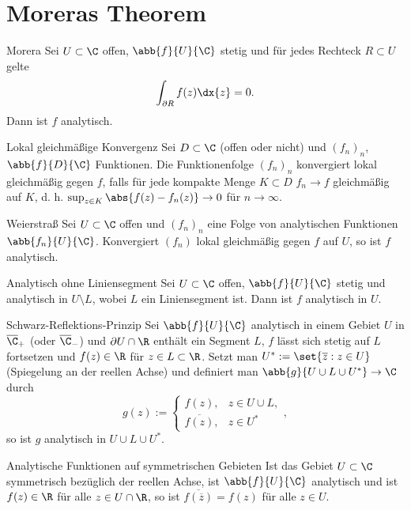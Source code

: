 \section{Moreras Theorem}

\begin{karte}{Morera}
    Sei \(U\subset \C\) offen, \(\abb{f}{U}{\C}\) stetig und für jedes Rechteck 
    \(R \subset U\) gelte 
    \[ \int_{\partial R} f(z) \dx{z} = 0. \]
    Dann ist \(f\) analytisch.
\end{karte}

\begin{karte}{Lokal gleichmäßige Konvergenz}
    Sei \( D \subset \C \) (offen oder nicht) und \((f_n)_n\), \(\abb{f}{D}{\C}\) Funktionen. 
    Die Funktionenfolge \((f_n)_n\) konvergiert lokal gleichmäßig 
    gegen \(f\), falls für jede kompakte Menge \(K \subset D\) \(f_n \rightarrow f\) 
    gleichmäßig auf \(K\), d. h. \(\sup_{z\in K} \abs{f(z) - f_n(z)} \rightarrow 0\) 
    für \(n\rightarrow \infty\).
\end{karte}

\begin{karte}{Weierstraß}
    Sei \(U \subset \C\) offen und \((f_n)_n\) eine Folge von analytischen Funktionen 
    \(\abb{f_n}{U}{\C}\). Konvergiert \((f_n)\) lokal gleichmäßig gegen \(f\) auf \(U\), 
    so ist \(f\) analytisch.
\end{karte}

\begin{karte}{Analytisch ohne Liniensegment}
    Sei \(U\subset \C\) offen, \(\abb{f}{U}{\C}\) stetig und analytisch in \(U \setminus L\), 
    wobei \(L\) ein Liniensegment ist. Dann ist \(f\) analytisch in \(U\).
\end{karte}

\begin{karte}{Schwarz-Reflektions-Prinzip}
    Sei \(\abb{f}{U}{\C}\) analytisch in einem Gebiet \(U\) in \(\overline{\C}_+\) 
    (oder \(\overline{\C}_-\)) und \(\partial U \cap \R\) enthält ein Segment \(L\), 
    \(f\) lässt sich stetig auf \(L\) fortsetzen und \(f(z)\in \R\) für \(z\in L\subset \R\). 
    Setzt man \(U^* := \set{\overline{z} : z \in U}\) (Spiegelung an der reellen Achse) 
    und definiert man \(\abb{g}{U\cup L \cup U^*} \rightarrow \C\) durch 
    \[ g(z) := \begin{cases}
        f(z), & z \in U \cup L, \\
        \overline{f(z)}, & z \in U^*
    \end{cases}, \]
    so ist \(g\) analytisch in \(U \cup L \cup U^*\).
\end{karte}

\begin{karte}{Analytische Funktionen auf symmetrischen Gebieten}
    Ist das Gebiet \(U \subset \C\) symmetrisch bezüglich der reellen Achse, 
    ist \(\abb{f}{U}{\C}\) analytisch und ist \(f(z) \in \R\) für alle \(z\in U \cap \R\), 
    so ist \(\overline{f(\overline{z})} = f(z)\) für alle \(z\in U\).
\end{karte}